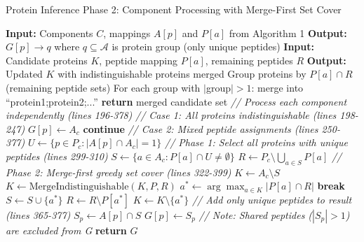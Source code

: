 \documentclass{article}
\begin{document}
\begin{algorithm}[H]
\caption{Protein Inference Phase 2: Component Processing with Merge-First Set Cover}
\begin{algorithmic}[1]
\State \textbf{Input:} Components $C$, mappings $A[p]$ and $P[a]$ from Algorithm 1
\State \textbf{Output:} $G[p] \to q$ where $q \subseteq \mathcal{A}$ is protein group (only unique peptides)
\State
{}
    \State \textbf{Input:} Candidate proteins $K$, peptide mapping $P[a]$, remaining peptides $R$
    \State \textbf{Output:} Updated $K$ with indistinguishable proteins merged
    \State Group proteins by $P[a] \cap R$ (remaining peptide sets)
    \State For each group with $|$group$| > 1$: merge into ``protein1;protein2;...''
    \State \textbf{return} merged candidate set
\EndFunction
\State
\State \textit{// Process each component independently (lines 196-378)}
    \State
    \State \textit{// Case 1: All proteins indistinguishable (lines 198-247)}
            \State $G[p] \gets A_c$ 
        \EndFor
        \State \textbf{continue}
    \EndIf
    \State
    \State \textit{// Case 2: Mixed peptide assignments (lines 250-377)}
    \State $U \gets \{p \in P_c : |A[p] \cap A_c| = 1\}$ 
    \State
    \State \textit{// Phase 1: Select all proteins with unique peptides (lines 299-310)}
    \State $S \gets \{a \in A_c : P[a] \cap U \neq \emptyset\}$ 
    \State $R \gets P_c \setminus \bigcup_{a \in S} P[a]$ 
    \State
    \State \textit{// Phase 2: Merge-first greedy set cover (lines 322-399)}
    \State $K \gets A_c \setminus S$ 
        \State $K \gets \text{MergeIndistinguishable}(K, P, R)$ 
        \State $a^* \gets \arg\max_{a \in K} |P[a] \cap R|$ 
            \State \textbf{break}
        \EndIf
        \State $S \gets S \cup \{a^*\}$ 
        \State $R \gets R \setminus P[a^*]$ 
        \State $K \gets K \setminus \{a^*\}$ 
    \EndWhile
    \State
    \State \textit{// Add only unique peptides to result (lines 365-377)}
        \State $S_p \gets A[p] \cap S$ 
            \State $G[p] \gets S_p$ 
        \EndIf
        \State \textit{// Note: Shared peptides ($|S_p| > 1$) are excluded from G}
    \EndFor
\EndFor
\State
\State \textbf{return} $G$
\end{algorithmic}
\end{algorithm}
\end{document}
